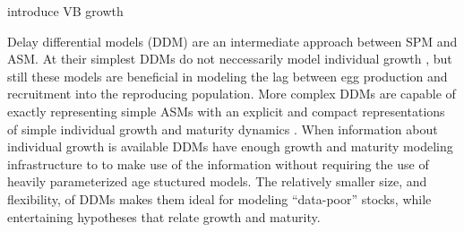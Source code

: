 {\color{red} introduce VB growth}

%
Delay differential models (DDM) are an intermediate approach between SPM and ASM. 
At their simplest DDMs do not neccessarily model individual growth \cite{dick_depletion-based_2011, aalto_separating_2015}, 
but still these models are beneficial in modeling the lag between egg production and recruitment into the reproducing population.  %
More complex DDMs are capable of exactly representing simple ASMs with an explicit and compact
representations of simple individual growth and maturity dynamics \cite{deriso_harvesting_1980, schnute_general_1985, schnute_general_1987}.
When information about individual growth is available DDMs have enough growth and maturity modeling infrastructure to %
to make use of the information without requiring the use of heavily parameterized age stuctured models. %
The relatively smaller size, and flexibility, of DDMs makes them ideal for modeling ``data-poor'' stocks, 
while entertaining hypotheses that relate growth and maturity.  

